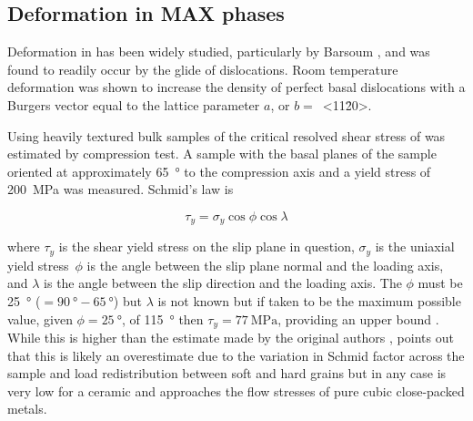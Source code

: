 \subsection{Deformation in MAX phases}

Deformation in  has been widely studied, particularly by Barsoum \cite{Farber1998,Barsoum1999,Farber1999,Barsoum1999dislocs_kinkbands,Barsoum2001}, and was found to readily occur by the glide of dislocations. Room temperature deformation was shown to increase the density of perfect basal dislocations with a Burgers vector equal to the lattice parameter $a$, or $b =$~<11\={2}0>. 

Using heavily textured bulk samples of  the critical resolved shear stress of  was estimated by compression test. A sample with the basal planes of the sample oriented at approximately \SI{65}{\degree} to the compression axis and a yield stress of \SI{200}{\mega\pascal} was measured. Schmid's law is 

\begin{equation}
\tau_y = \sigma_y \cos{\phi} \cos{\lambda}
\end{equation}

where $\tau_y$ is the shear yield stress on the slip plane in question, $\sigma_y$ is the uniaxial yield stress\ $\phi$ is the angle between the slip plane normal and the loading axis, and $\lambda$ is the angle between the slip direction and the loading axis. The $\phi$ must be \SI{25}{\degree} ($=\SI{90}{\degree} - \SI{65}{\degree}$) but $\lambda$ is not known but if taken to be the maximum possible value, given $\phi=\SI{25}{\degree}$, of \SI{115}{\degree} then $\tau_y = \SI{77}{\mega\pascal}$, providing an upper bound \cite{Humphrey2012}. While this is higher than the estimate made by the original authors \cite{Barsoum1999}, \citet{Humphrey2012} points out that this is likely an overestimate due to the variation in Schmid factor across the sample and load redistribution between soft and hard grains but in any case is very low for a ceramic and approaches the flow stresses of pure cubic close-packed metals.


%
%
%
%
%
%
%
%
%
%
%
%


